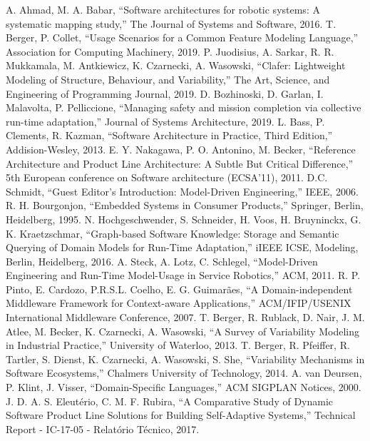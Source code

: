 \documentclass[conference]{IEEEtran}
\begin{document}
\begin{thebibliography}{00}
 A. Ahmad, M. A. Babar, ``Software architectures for robotic systems: A systematic mapping
study,'' The Journal of Systems and Software, 2016.
 T. Berger, P. Collet, ``Usage Scenarios for a Common Feature Modeling Language,'' Association for Computing Machinery, 2019.
 P. Juodisius, A. Sarkar, R. R. Mukkamala, M. Antkiewicz, K. Czarnecki, A. Wasowski, ``Clafer: Lightweight Modeling of Structure, Behaviour, and Variability,'' The Art, Science, and Engineering of Programming Journal, 2019.
 D. Bozhinoski, D. Garlan, I. Malavolta, P. Pelliccione, ``Managing safety and mission completion via collective run-time adaptation,'' Journal of Systems Architecture, 2019.
 L. Bass, P. Clements, R. Kazman, ``Software Architecture in Practice, Third Edition,'' Addision-Wesley, 2013.
 E. Y. Nakagawa, P. O. Antonino, M. Becker, ``Reference Architecture and Product Line Architecture: A Subtle But Critical Difference,'' 5th European conference on Software architecture (ECSA'11), 2011.
 D.C. Schmidt, ``Guest Editor's Introduction: Model-Driven Engineering,'' IEEE, 2006.
R. H. Bourgonjon, ``Embedded Systems in Consumer Products,'' Springer, Berlin, Heidelberg, 1995.
 N. Hochgeschwender, S. Schneider, H. Voos, H. Bruyninckx, G. K. Kraetzschmar, ``Graph-based Software Knowledge: Storage and Semantic Querying of Domain Models for Run-Time Adaptation,'' iIEEE ICSE, Modeling, Berlin, Heidelberg, 2016.
 A. Steck, A. Lotz, C. Schlegel, ``Model-Driven Engineering and Run-Time Model-Usage in Service Robotics,'' ACM, 2011.
 R. P. Pinto, E. Cardozo, P.R.S.L. Coelho, E. G. Guimarães, ``A Domain-independent Middleware Framework for Context-aware Applications,'' ACM/IFIP/USENIX International Middleware Conference, 2007.
 T. Berger, R. Rublack, D. Nair, J. M. Atlee, M. Becker, K. Czarnecki, A. Wasowski, ``A Survey of Variability Modeling in Industrial Practice,'' University of Waterloo, 2013.
 T. Berger, R. Pfeiffer, R. Tartler, S. Dienst, K. Czarnecki, A. Wasowski,  S. She, ``Variability Mechanisms in Software Ecosystems,'' Chalmers University of Technology, 2014.
 A. van Deursen, P. Klint, J. Visser, ``Domain-Specific Languages,'' ACM SIGPLAN Notices, 2000.
 J. D. A. S. Eleutério, C. M. F. Rubira, ``A Comparative Study of Dynamic Software Product Line Solutions for Building Self-Adaptive Systems,'' Technical Report - IC-17-05 - Relatório Técnico, 2017.

\end{thebibliography}
\end{document}
